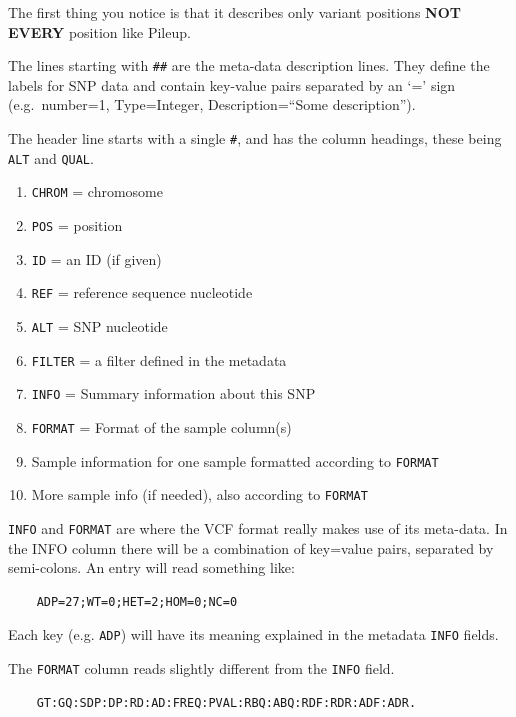 \documentclass[12pt,]{book}
\providecommand{\tightlist}{%
  \setlength{\itemsep}{0pt}\setlength{\parskip}{0pt}}
\begin{document}
The first thing you notice is that it describes only variant positions
\textbf{NOT} \textbf{EVERY} position like Pileup.

The lines starting with \texttt{\#\#} are the meta-data description
lines. They define the labels for SNP data and contain key-value pairs
separated by an `=' sign (e.g.~number=1, Type=Integer,
Description=``Some description'').

The header line starts with a single \texttt{\#}, and has the column
headings, these being \texttt{ALT} and \texttt{QUAL}.

\begin{enumerate}
\def\labelenumi{\arabic{enumi}.}
\tightlist
\item
  \texttt{CHROM} = chromosome
\item
  \texttt{POS} = position
\item
  \texttt{ID} = an ID (if given)
\item
  \texttt{REF} = reference sequence nucleotide
\item
  \texttt{ALT} = SNP nucleotide
\item
  \texttt{FILTER} = a filter defined in the metadata
\item
  \texttt{INFO} = Summary information about this SNP
\item
  \texttt{FORMAT} = Format of the sample column(s)
\item
  Sample information for one sample formatted according to
  \texttt{FORMAT}
\item
  More sample info (if needed), also according to \texttt{FORMAT}
\end{enumerate}

\texttt{INFO} and \texttt{FORMAT} are where the VCF format really makes
use of its meta-data. In the INFO column there will be a combination of
key=value pairs, separated by semi-colons. An entry will read something
like:

\begin{verbatim}
    ADP=27;WT=0;HET=2;HOM=0;NC=0
\end{verbatim}

Each key (e.g. \texttt{ADP}) will have its meaning explained in the
metadata \texttt{INFO} fields.

The \texttt{FORMAT} column reads slightly different from the
\texttt{INFO} field.

\begin{verbatim}
    GT:GQ:SDP:DP:RD:AD:FREQ:PVAL:RBQ:ABQ:RDF:RDR:ADF:ADR. 
\end{verbatim}
\end{document}
